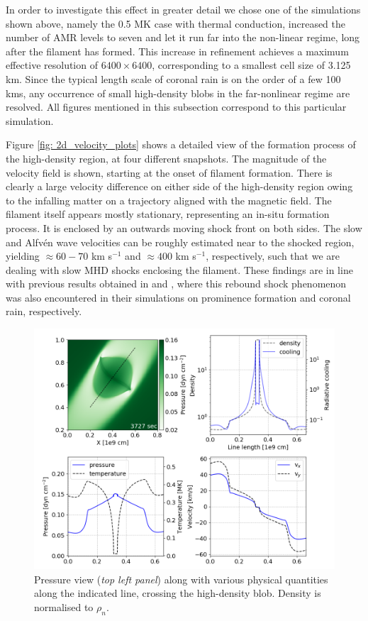 In order to investigate this effect in greater detail we chose one of the simulations shown above, namely the 0.5 MK case with thermal conduction, increased the number of AMR levels to seven and let it run far into the non-linear regime, long after the filament has formed. This increase in refinement achieves a maximum effective resolution of $6400 \times 6400$, corresponding to a smallest cell size of 3.125 km. Since the typical length scale of coronal rain is on the order of a few 100 kms, any occurrence of small high-density blobs in the far-nonlinear regime are resolved. All figures mentioned in this subsection correspond to this particular simulation.



Figure \ref{fig: 2d_velocity_plots} shows a detailed view of the formation process of the high-density region, at four different snapshots. The magnitude of the velocity field is shown, starting at the onset of filament formation. There is clearly a large velocity difference on either side of the high-density region owing to the infalling matter on a trajectory aligned with the magnetic field. The filament itself appears mostly stationary, representing an in-situ formation process. It is enclosed by an outwards moving shock front on both sides. The slow and Alfv\'en wave velocities can be roughly estimated near to the shocked region, yielding $\approx 60-70$ km s$^{-1}$ and $\approx 400$ km s$^{-1}$, respectively, such that we are dealing with slow MHD shocks enclosing the filament. These findings are in line with previous results obtained in \citet{xia2012} and \citet{fang2015}, where this rebound shock phenomenon was also encountered in their simulations on prominence formation and coronal rain, respectively.

\begin{figure}[b]
  \centering
  \includegraphics[width=\textwidth]{2d_lineplots.png}
  \caption{
    Pressure view (\emph{top left panel}) along with various physical quantities along the indicated line, crossing the high-density blob. Density is normalised to $\rho_n$.
  }
  \label{fig: 2d_lineplots}
\end{figure}

